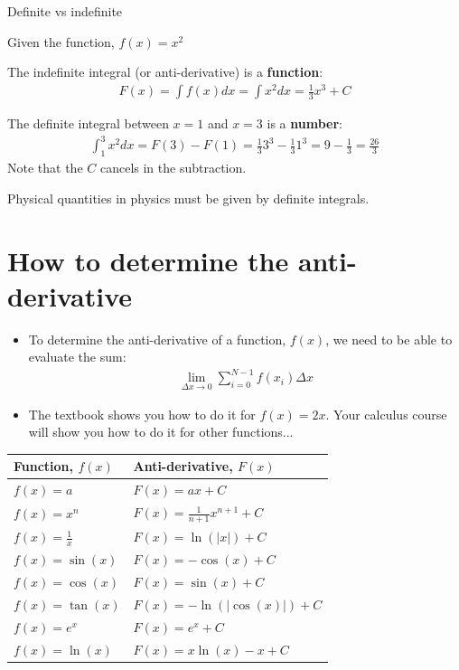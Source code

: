 \documentclass[aspectratio=169,
hyperref={colorlinks,urlcolor=blue}
]{beamer}
\begin{document}
\begin{bulletframe}{Definite vs indefinite}
\item Given the function, $f(x)=x^2$
\item The indefinite integral (or anti-derivative) is a \textbf{function}:
\begin{align*}
F(x) = \int f(x) dx=\int x^2dx = \frac{1}{3}x^3+C
\end{align*}
\item The definite integral between $x=1$ and $x=3$ is a \textbf{number}:
\begin{align*}
\int_1^3x^2dx = F(3) - F(1) = \frac{1}{3}3^3-\frac{1}{3}1^3=9-\frac{1}{3}=\frac{26}{3}
\end{align*}
Note that the $C$ cancels in the subtraction.
\item Physical quantities in physics must be given by definite integrals.
\end{bulletframe}


\section{How to determine the anti-derivative}
\label{sec:determiningantider}
{
\begin{itemize}
\item To determine the anti-derivative of a function, $f(x)$, we need to be able to evaluate the sum:
\begin{align*}
\lim_{\Delta x \to 0}\sum_{i=0}^{N-1}f(x_i)\Delta x
\end{align*}
\item The textbook shows you how to do it for $f(x)=2x$. Your calculus course will show you how to do it for other functions...
\end{itemize}
}
{
\begin{center}
\scriptsize
\begin{tabular}{l l}
\textbf{Function, $f(x)$} & \textbf{Anti-derivative, $F(x)$}\\
\hline\hline
$f(x)=a$ & $F(x)=ax+C$ \\
$f(x)=x^n$ & $F(x)=\frac{1}{n+1}x^{n+1}+C$ \\
$f(x)=\frac{1}{x}$ & $F(x)=\ln(|x|)+C$ \\
$f(x)=\sin(x)$ & $F(x)=-\cos(x)+C$ \\
$f(x)=\cos(x)$ & $F(x)=\sin(x)+C$ \\
$f(x)=\tan(x)$ & $F(x)=-\ln(|\cos(x)|)+C$ \\
$f(x)=e^x$ & $F(x)=e^x+C$ \\
$f(x)=\ln(x)$ & $F(x)=x\ln(x)-x+C$ \\
\hline
\end{tabular}
\end{center}
}
\end{document}
